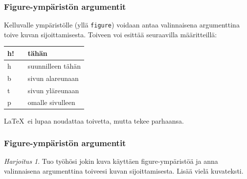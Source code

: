 \documentclass[handout,hyperref={colorlinks=true}]{beamer}
\theoremstyle{remark}
\newtheorem{harj}{Harjoitus}[section]
\begin{document}
\begin{frame}[fragile]
    \frametitle{Figure-ympäristön argumentit}
    Kelluvalle ympäristölle (yllä \verb-figure-) voidaan antaa valinnaisena argumenttina toive kuvan sijoittamisesta. Toiveen voi esittää seuraavilla määritteillä:
    \begin{table}
        \begin{tabular}{lcl}

            h! && tähän\\
            \hline
            h && suunnilleen tähän\\
            \hline
            b && sivun alareunaan\\
            \hline
            t && sivun yläreunaan\\
            \hline
            p && omalle sivulleen\\

        \end{tabular}
    \end{table}
    \LaTeX\ ei lupaa noudattaa toivetta, mutta tekee parhaansa. 
\end{frame}
\begin{frame}[fragile]
    \frametitle{Figure-ympäristön argumentit}
    \begin{harj}
        Tuo työhösi jokin kuva käyttäen figure-ympäristöä ja anna valinnaisena argumenttina toiveesi kuvan sijoittamisesta. Lisää vielä kuvateksti.
    \end{harj}
\end{frame}
\end{document}
